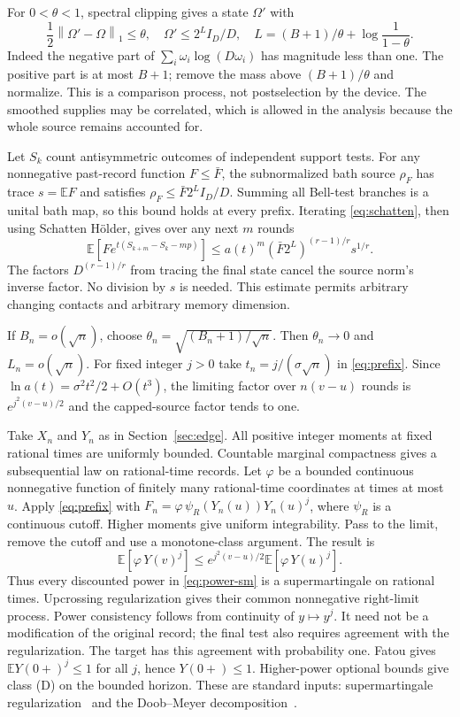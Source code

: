 \documentclass[11pt]{article}
\theoremstyle{definition}
\theoremstyle{remark}
\newcommand{\E}{\mathbb E}
\newcommand{\norm}[1]{\left\lVert#1\right\rVert}
\begin{document}
For $0<\theta<1$, spectral clipping gives a state $\Omega'$ with
\begin{equation}\label{eq:clip}
 \frac12\norm{\Omega'-\Omega}_1\le\theta,\quad
 \Omega'\le2^L I_D/D,\quad
 L=(B+1)/\theta+\log\frac1{1-\theta}.
\end{equation}
Indeed the negative part of $\sum_i\omega_i\log(D\omega_i)$ has magnitude less than one. The positive part is at most $B+1$; remove the mass above $(B+1)/\theta$ and normalize. This is a comparison process, not postselection by the device. The smoothed supplies may be correlated, which is allowed in the analysis because the whole source remains accounted for.

Let $S_k$ count antisymmetric outcomes of independent support tests. For any nonnegative past-record function $F\le\bar F$, the subnormalized bath source $\rho_F$ has trace $s=\E F$ and satisfies $\rho_F\le\bar F2^L I_D/D$. Summing all Bell-test branches is a unital bath map, so this bound holds at every prefix. Iterating \eqref{eq:schatten}, then using Schatten H\"older, gives over any next $m$ rounds
\begin{equation}\label{eq:prefix}
 \E\left[F e^{t(S_{k+m}-S_k-mp)}\right]
 \le a(t)^m(\bar F2^L)^{(r-1)/r}s^{1/r}.
\end{equation}
The factors $D^{(r-1)/r}$ from tracing the final state cancel the source norm's inverse factor. No division by $s$ is needed. This estimate permits arbitrary changing contacts and arbitrary memory dimension.

If $B_n=o(\sqrt n)$, choose $\theta_n=\sqrt{(B_n+1)/\sqrt n}$. Then $\theta_n\to0$ and $L_n=o(\sqrt n)$. For fixed integer $j>0$ take $t_n=j/(\sigma\sqrt n)$ in \eqref{eq:prefix}. Since $\ln a(t)=\sigma^2t^2/2+O(t^3)$, the limiting factor over $n(v-u)$ rounds is $e^{j^2(v-u)/2}$ and the capped-source factor tends to one.

Take $X_n$ and $Y_n$ as in Section~\ref{sec:edge}. All positive integer moments at fixed rational times are uniformly bounded. Countable marginal compactness gives a subsequential law on rational-time records. Let $\varphi$ be a bounded continuous nonnegative function of finitely many rational-time coordinates at times at most $u$. Apply \eqref{eq:prefix} with $F_n=\varphi\,\psi_R(Y_n(u))Y_n(u)^j$, where $\psi_R$ is a continuous cutoff. Higher moments give uniform integrability. Pass to the limit, remove the cutoff and use a monotone-class argument. The result is
\[
 \E[\varphi\, Y(v)^j]\le e^{j^2(v-u)/2}\E[\varphi\, Y(u)^j].
\]
Thus every discounted power in \eqref{eq:power-sm} is a supermartingale on rational times. Upcrossing regularization gives their common nonnegative right-limit process. Power consistency follows from continuity of $y\mapsto y^j$. It need not be a modification of the original record; the final test also requires agreement with the regularization. The target has this agreement with probability one. Fatou gives $\E Y(0+)^j\le1$ for all $j$, hence $Y(0+)\le1$. Higher-power optional bounds give class (D) on the bounded horizon. These are standard inputs: supermartingale regularization~\cite[Theorems~II.2.9 and~II.2.10]{RevuzYor} and the Doob--Meyer decomposition~\cite[Theorem~I.3.15]{JS}.
\end{document}
